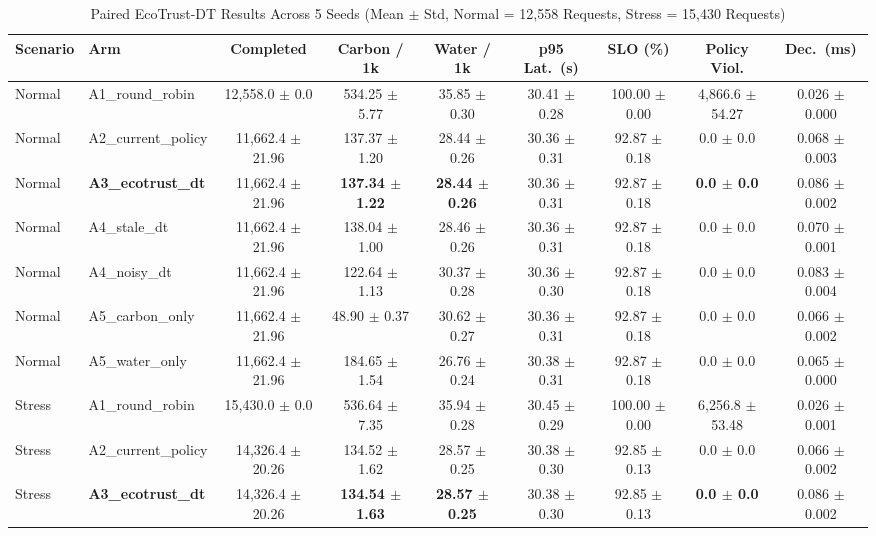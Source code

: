 \documentclass[conference]{IEEEtran}
\begin{document}
\begin{table}[!t]
\caption{Paired EcoTrust-DT Results Across 5 Seeds (Mean $\pm$ Std, Normal = 12,558 Requests, Stress = 15,430 Requests)}
\label{tab:ecotrust_results}
\centering
\scriptsize
\setlength{\tabcolsep}{4pt}
\renewcommand{\arraystretch}{1.15}
\begin{tabular}{@{}llccccccc@{}}
\toprule
\textbf{Scenario} & \textbf{Arm} & \textbf{Completed} & \textbf{Carbon / 1k} & \textbf{Water / 1k} & \textbf{p95 Lat.\ (s)} & \textbf{SLO (\%)} & \textbf{Policy Viol.} & \textbf{Dec.\ (ms)} \\
\midrule
Normal & A1\_round\_robin & 12,558.0 $\pm$ 0.0 & 534.25 $\pm$ 5.77 & 35.85 $\pm$ 0.30 & 30.41 $\pm$ 0.28 & 100.00 $\pm$ 0.00 & 4,866.6 $\pm$ 54.27 & 0.026 $\pm$ 0.000 \\
Normal & A2\_current\_policy & 11,662.4 $\pm$ 21.96 & 137.37 $\pm$ 1.20 & 28.44 $\pm$ 0.26 & 30.36 $\pm$ 0.31 & 92.87 $\pm$ 0.18 & 0.0 $\pm$ 0.0 & 0.068 $\pm$ 0.003 \\
Normal & \textbf{A3\_ecotrust\_dt} & 11,662.4 $\pm$ 21.96 & \textbf{137.34 $\pm$ 1.22} & \textbf{28.44 $\pm$ 0.26} & 30.36 $\pm$ 0.31 & 92.87 $\pm$ 0.18 & \textbf{0.0 $\pm$ 0.0} & 0.086 $\pm$ 0.002 \\
Normal & A4\_stale\_dt & 11,662.4 $\pm$ 21.96 & 138.04 $\pm$ 1.00 & 28.46 $\pm$ 0.26 & 30.36 $\pm$ 0.31 & 92.87 $\pm$ 0.18 & 0.0 $\pm$ 0.0 & 0.070 $\pm$ 0.001 \\
Normal & A4\_noisy\_dt & 11,662.4 $\pm$ 21.96 & 122.64 $\pm$ 1.13 & 30.37 $\pm$ 0.28 & 30.36 $\pm$ 0.30 & 92.87 $\pm$ 0.18 & 0.0 $\pm$ 0.0 & 0.083 $\pm$ 0.004 \\
Normal & A5\_carbon\_only & 11,662.4 $\pm$ 21.96 & 48.90 $\pm$ 0.37 & 30.62 $\pm$ 0.27 & 30.36 $\pm$ 0.31 & 92.87 $\pm$ 0.18 & 0.0 $\pm$ 0.0 & 0.066 $\pm$ 0.002 \\
Normal & A5\_water\_only & 11,662.4 $\pm$ 21.96 & 184.65 $\pm$ 1.54 & 26.76 $\pm$ 0.24 & 30.38 $\pm$ 0.31 & 92.87 $\pm$ 0.18 & 0.0 $\pm$ 0.0 & 0.065 $\pm$ 0.000 \\
\midrule
Stress & A1\_round\_robin & 15,430.0 $\pm$ 0.0 & 536.64 $\pm$ 7.35 & 35.94 $\pm$ 0.28 & 30.45 $\pm$ 0.29 & 100.00 $\pm$ 0.00 & 6,256.8 $\pm$ 53.48 & 0.026 $\pm$ 0.001 \\
Stress & A2\_current\_policy & 14,326.4 $\pm$ 20.26 & 134.52 $\pm$ 1.62 & 28.57 $\pm$ 0.25 & 30.38 $\pm$ 0.30 & 92.85 $\pm$ 0.13 & 0.0 $\pm$ 0.0 & 0.066 $\pm$ 0.002 \\
Stress & \textbf{A3\_ecotrust\_dt} & 14,326.4 $\pm$ 20.26 & \textbf{134.54 $\pm$ 1.63} & \textbf{28.57 $\pm$ 0.25} & 30.38 $\pm$ 0.30 & 92.85 $\pm$ 0.13 & \textbf{0.0 $\pm$ 0.0} & 0.086 $\pm$ 0.002 \\

\end{tabular}
\end{table}
\end{document}
